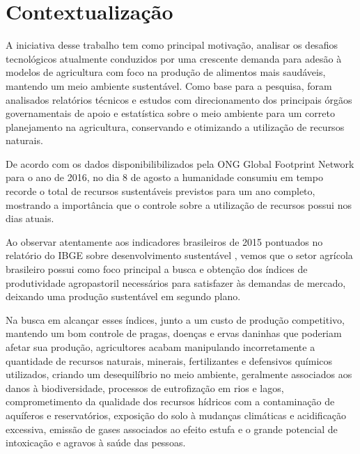 \section{Contextualiza\c{c}\~ao} 
A iniciativa desse trabalho tem como principal motiva\c{c}\~{a}o, analisar os desafios tecnol\'{o}gicos atualmente conduzidos por uma crescente demanda para ades\~{a}o \`{a} modelos de agricultura com foco na produ\c{c}\~{a}o de alimentos mais saud\'{a}veis, mantendo um meio ambiente sustent\'{a}vel. Como base para a pesquisa, foram analisados relat\'{o}rios t\'{e}cnicos e estudos com direcionamento dos principais \'{o}rg\~{a}os governamentais de apoio e estat\'{i}stica sobre o meio ambiente para um correto planejamento na agricultura, conservando e otimizando a utiliza\c{c}\~{a}o de recursos naturais.

De acordo com os dados disponibilibilizados pela ONG  Global Footprint Network \cite{GFN2017} para o ano de 2016, no dia 8 de agosto a humanidade consumiu em tempo recorde o total de recursos sustent\'{a}veis previstos para um ano completo, mostrando a import\^{a}ncia que o controle sobre a utiliza\c{c}\~{a}o de recursos possui nos dias atuais. 

Ao observar atentamente aos indicadores brasileiros de 2015 pontuados no relat\'{o}rio do IBGE  sobre desenvolvimento sustent\'{a}vel \cite{IBGE94254}, vemos que o setor agr\'{i}cola brasileiro possui como foco principal a busca e obten\c{c}\~{a}o dos \'{i}ndices de produtividade agropastoril necess\'{a}rios para satisfazer \`{a}s demandas de mercado, deixando uma produ\c{c}\~{a}o sustent\'{a}vel em segundo plano. 

Na busca em alcan\c{c}ar esses \'{i}ndices, junto a um custo de produ\c{c}\~{a}o competitivo, mantendo um bom controle de pragas, doen\c{c}as e ervas daninhas que poderiam afetar sua produ\c{c}\~{a}o, agricultores acabam manipulando incorretamente a quantidade de recursos naturais, minerais, fertilizantes e defensivos qu\'{i}micos utilizados, criando um desequil\'{i}brio no meio ambiente, geralmente associados aos danos \`{a} biodiversidade, processos de eutrofiza\c{c}\~{a}o em rios e lagos, comprometimento da qualidade dos recursos h\'{i}dricos com a contamina\c{c}\~{a}o de aqu\'{i}feros e reservat\'{o}rios, exposi\c{c}\~{a}o do solo \`{a} mudan\c{c}as clim\'{a}ticas e acidifica\c{c}\~{a}o excessiva, emiss\~{a}o de gases associados ao efeito estufa e o grande potencial de intoxica\c{c}\~{a}o e agravos \`{a} sa\'{u}de das pessoas. 

